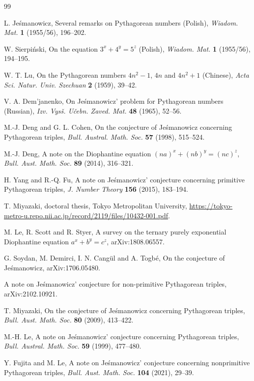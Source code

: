 \documentclass[11pt,a4paper]{article}
\theoremstyle{remark}
\begin{document}
\begin{thebibliography}{99}

 L. Je\'smanowicz, Several remarks on Pythagorean numbers (Polish),
\emph{Wiadom. Mat.} \textbf{1} (1955/56), 196--202.

 W. Sierpi\'nski, On the equation $3^x+4^y=5^z$ (Polish),
\emph{Wiadom. Mat.} \textbf{1} (1955/56), 194--195.

 W. T. Lu, On the Pythagorean numbers $4n^2-1$, $4n$ and $4n^2+1$
(Chinese), \emph{Acta Sci. Natur. Univ. Szechuan} \textbf{2} (1959), 39--42.

 V. A. Dem'janenko, On Je\'smanowicz' problem for Pythagorean
numbers (Russian), \emph{Izv. Vys\v{s}. U\v{c}ebn. Zaved. Mat.} \textbf{48}
(1965), 52--56.

 M.-J. Deng and G. L. Cohen, On the conjecture of Je\'smanowicz
concerning Pythagorean triples, \emph{Bull. Austral. Math. Soc.} \textbf{57}
(1998), 515--524.

 M.-J. Deng, A note on the Diophantine equation
$(na)^x+(nb)^y=(nc)^z$, \emph{Bull. Aust. Math. Soc.} \textbf{89} (2014),
316--321.

 H. Yang and R.-Q. Fu, A note on Je\'smanowicz' conjecture
concerning primitive Pythagorean triples, \emph{J. Number Theory} \textbf{156}
(2015), 183--194.

 T. Miyazaki, doctoral thesis, Tokyo Metropolitan University,
\url{https://tokyo-metro-u.repo.nii.ac.jp/record/2119/files/10432-001.pdf}.

 M. Le, R. Scott and R. Styer, A survey on the ternary purely
exponential Diophantine equation $a^x+b^y=c^z$, arXiv:1808.06557.

 G. Soydan, M. Demirci, I. N. Cang\"ul and A. Togb\'e, On the
conjecture of Je\'smanowicz, arXiv:1706.05480.

 A note on Je\'smanowicz' conjecture for non-primitive
Pythagorean triples, arXiv:2102.10921.

 T. Miyazaki, On the conjecture of Je\'smanowicz concerning
Pythagorean triples, \emph{Bull. Aust. Math. Soc.} \textbf{80} (2009),
413--422.

 M.-H. Le, A note on Je\'smanowicz' conjecture concerning
Pythagorean triples, \emph{Bull. Austral. Math. Soc.} \textbf{59} (1999),
477--480.

 Y. Fujita and M. Le, A note on Je\'smanowicz' conjecture
concerning nonprimitive Pythagorean triples, \emph{Bull. Aust. Math. Soc.}
\textbf{104} (2021), 29--39.


\end{thebibliography}
\end{document}
